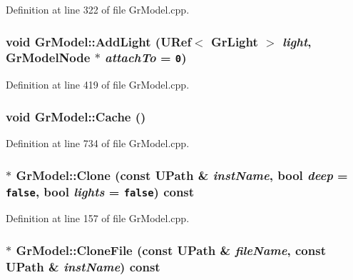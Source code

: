 Definition at line 322 of file GrModel.cpp.\hypertarget{class_gr_model_4d7fbb62dd1022da5a5fd25c6cb0e1fc}{
\subsubsection[{AddLight}]{\setlength{\rightskip}{0pt plus 5cm}void GrModel::AddLight ({\bf URef}$<$ {\bf GrLight} $>$ {\em light}, \/  {\bf GrModelNode} $\ast$ {\em attachTo} = {\tt 0})}}
\label{class_gr_model_4d7fbb62dd1022da5a5fd25c6cb0e1fc}




Definition at line 419 of file GrModel.cpp.\hypertarget{class_gr_model_d3a2e4287aebf5351e971b9b64dbbe11}{
\subsubsection[{Cache}]{\setlength{\rightskip}{0pt plus 5cm}void GrModel::Cache ()}}
\label{class_gr_model_d3a2e4287aebf5351e971b9b64dbbe11}




Definition at line 734 of file GrModel.cpp.\hypertarget{class_gr_model_29d55ee007063d294ee9097c56d9f453}{
\subsubsection[{Clone}]{ $\ast$ GrModel::Clone (const {\bf UPath} \& {\em instName}, \/  bool {\em deep} = {\tt false}, \/  bool {\em lights} = {\tt false}) const}}
\label{class_gr_model_29d55ee007063d294ee9097c56d9f453}




Definition at line 157 of file GrModel.cpp.\hypertarget{class_gr_model_fe7a05f880c1d67b55ef8130971836d6}{
\subsubsection[{CloneFile}]{ $\ast$ GrModel::CloneFile (const {\bf UPath} \& {\em fileName}, \/  const {\bf UPath} \& {\em instName}) const}}
\label{class_gr_model_fe7a05f880c1d67b55ef8130971836d6}




